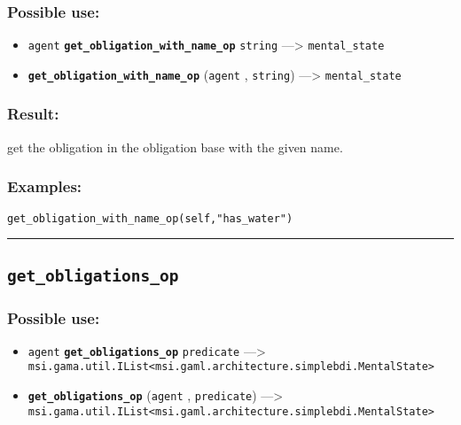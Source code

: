 \documentclass[]{book}
\providecommand{\tightlist}{%
  \setlength{\itemsep}{0pt}\setlength{\parskip}{0pt}}
\theoremstyle{definition}
\theoremstyle{definition}
\theoremstyle{definition}
\theoremstyle{remark}
\begin{document}
\subsubsection{Possible use:}\label{possible-use-222}

\begin{itemize}
\tightlist
\item
  \texttt{agent} \textbf{\texttt{get\_obligation\_with\_name\_op}}
  \texttt{string} ---\textgreater{} \texttt{mental\_state}
\item
  \textbf{\texttt{get\_obligation\_with\_name\_op}} (\texttt{agent} ,
  \texttt{string}) ---\textgreater{} \texttt{mental\_state}
\end{itemize}

\subsubsection{Result:}\label{result-216}

get the obligation in the obligation base with the given name.

\subsubsection{Examples:}\label{examples-169}

\begin{verbatim}
get_obligation_with_name_op(self,"has_water") 
\end{verbatim}

\begin{center}\rule{0.5\linewidth}{\linethickness}\end{center}

\subsection{\texorpdfstring{\texttt{get\_obligations\_op}}{get\_obligations\_op}}\label{get_obligations_op}

\subsubsection{Possible use:}\label{possible-use-223}

\begin{itemize}
\tightlist
\item
  \texttt{agent} \textbf{\texttt{get\_obligations\_op}}
  \texttt{predicate} ---\textgreater{}
  \texttt{msi.gama.util.IList\textless{}msi.gaml.architecture.simplebdi.MentalState\textgreater{}}
\item
  \textbf{\texttt{get\_obligations\_op}} (\texttt{agent} ,
  \texttt{predicate}) ---\textgreater{}
  \texttt{msi.gama.util.IList\textless{}msi.gaml.architecture.simplebdi.MentalState\textgreater{}}
\end{itemize}
\end{document}

